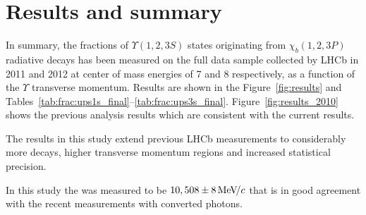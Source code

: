 \section{Results and summary}
\label{sec:results}

In summary, the fractions of $\Upsilon(1,2,3S)$ states originating from $\chi_b(1,2,3P)$ 
radiative decays has been measured on the full data sample collected by LHCb in 2011 and 2012 
at center of mass energies of 7 and 8 \tev respectively, as a function of the $\Upsilon$ 
transverse momentum. Results are shown in the Figure~\ref{fig:results} and 
Tables~\ref{tab:frac:ups1s_final}--\ref{tab:frac:ups3s_final}.
Figure~\ref{fig:results_2010} shows the previous analysis results which
are consistent with the current results.






The results in this study extend previous LHCb measurements to considerably
more decays, higher transverse momentum regions and increased statistical
precision.

In this study the \chiboneThreeP was measured to be $10,508 \pm 8 {\mathrm{\,Me\kern -0.1em V\!/}c}$ that
is in good agreement with the recent \lhcb measurements with converted photons.


